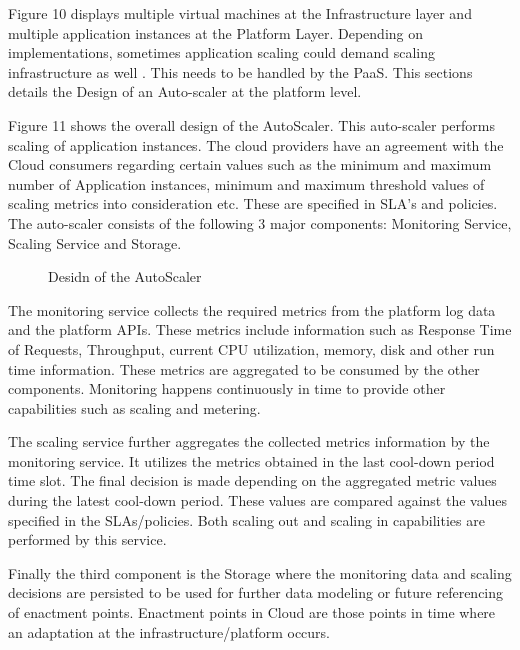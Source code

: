\documentclass[article,type=msc,colorback,12pt,accentcolor=tud7b,table]{tudthesis}
\begin{document}
 	Figure 10 displays multiple virtual machines at the Infrastructure layer and multiple application instances at the Platform Layer. Depending on implementations, sometimes application scaling could demand scaling infrastructure as well \cite{cf_scale}. This needs to be handled by the PaaS. This sections details the Design of an Auto-scaler at the platform level. 
		
 	Figure 11 shows the overall design of the AutoScaler. This auto-scaler performs scaling of application instances. The cloud providers have an agreement with the Cloud consumers regarding certain values such as the minimum and maximum number of Application instances, minimum and maximum threshold values of scaling metrics into consideration etc. These are specified in SLA's and policies. The auto-scaler consists of the following 3 major components: Monitoring Service, Scaling Service and Storage.
 	
 	 \begin{figure}[!h]
 	 	\begin{center}
 	 		\makebox[\textwidth]{\texttt{[image: C4]}}
 	 	\end{center}
 	 	\caption{Desidn of the AutoScaler}
 	 \end{figure}
 	
 	The monitoring service collects the required metrics from the platform log data and the platform APIs. These metrics include information such as Response Time of Requests, Throughput, current CPU utilization, memory, disk and other run time information. These metrics are aggregated to be consumed by the other components. Monitoring happens continuously in time to provide other capabilities such as scaling and metering.
 	
 	The scaling service further aggregates the collected metrics information by the monitoring service. It utilizes the metrics obtained in the last cool-down period time slot. The final decision is made depending on the aggregated metric values during the latest cool-down period. These values are compared against the values specified in the SLAs/policies. Both scaling out and scaling in capabilities are performed by this service.
 	
 	Finally the third component is the Storage where the monitoring data and scaling decisions are persisted to be used for further data modeling or future referencing of enactment points. Enactment points in Cloud are those points in time where an adaptation at the infrastructure/platform occurs. 
 	
\end{document}
